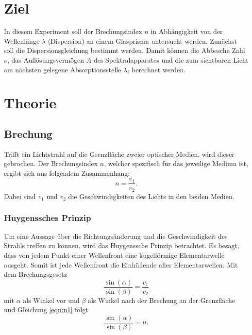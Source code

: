 \section{Ziel}
\label{sec:Ziel}
In diesem Experiment soll der Brechungsindex $n$ in Abhängigkeit von der Wellenlänge $\lambda$ (Dispersion) an einem Glasprisma untersucht werden. Zunächst soll die Dispersionsgleichung bestimmt werden. Damit können die Abbesche Zahl $\nu$, das Auflösungsvermögen $A$ des Spektralapparates und die zum sichtbaren Licht am nächsten gelegene Absorptionsstelle $\lambda_i$ berechnet werden.

\section{Theorie}
\label{sec:theorie}
\subsection{Brechung}
Trifft ein Lichtstrahl auf die Grenzfläche zweier optischer Medien, wird dieser gebrochen. Der Brechungsindex $n$, welcher spezifisch für das jeweilige Medium ist, ergibt sich aus folgendem Zusammenhang:
\begin{equation}
  \label{eqn:n1}
  n=\frac{v_1}{v_2}.
\end{equation}
Dabei sind $v_1$ und $v_2$ die Geschwindigkeiten des Lichts in den beiden Medien.

\subsubsection{Huygenssches Prinzip}
Um eine Aussage über die Richtungsänderung und die Geschwindigkeit des Strahls treffen zu können, wird das Huygenssche Prinzip betrachtet. Es besagt, dass von jedem Punkt einer Wellenfront eine kugelförmige Elementarwelle ausgeht. Somit ist jede Wellenfront die Einhüllende aller Elementarwellen. Mit dem Brechungsgesetz
\begin{equation}
  \frac{\sin(\alpha)}{\sin(\beta)} =\frac{v_1}{v_2}
\end{equation}
mit $\alpha$ als Winkel vor und $\beta$ als Winkel nach der Brechung an der Grenzfläche und Gleichung \ref{eqn:n1} folgt
\begin{equation}
  \frac{\sin(\alpha)}{\sin(\beta)} = n.
\end{equation}

